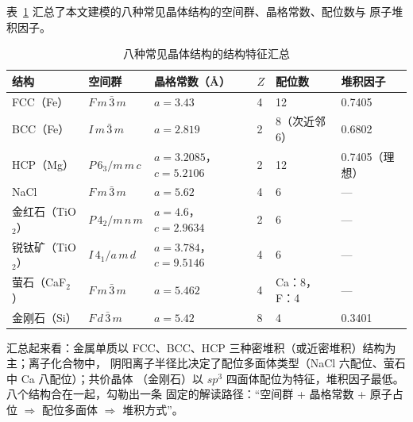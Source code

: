 表~\ref{tab:summary} 汇总了本文建模的八种常见晶体结构的空间群、晶格常数、配位数与
原子堆积因子。

\begin{table}[H]
  \centering
  \small
  \caption{八种常见晶体结构的结构特征汇总}
  \label{tab:summary}
  \begin{tabular}{@{}llllll@{}}
    \toprule
    结构 & 空间群 & 晶格常数（\AA） & $Z$ & 配位数 & 堆积因子 \\
    \midrule
    FCC（Fe） & $F\,m\,\bar3\,m$ & $a=3.43$ & 4 & 12 & 0.7405 \\
    BCC（Fe） & $I\,m\,\bar3\,m$ & $a=2.819$ & 2 & 8（次近邻 6） & 0.6802 \\
    HCP（Mg） & $P\,6_3/m\,m\,c$ & $a=3.2085$，$c=5.2106$ & 2 & 12 & 0.7405（理想） \\
    NaCl & $F\,m\,\bar3\,m$ & $a=5.62$ & 4 & 6 & — \\
    金红石（TiO$_2$） & $P\,4_2/m\,n\,m$ & $a=4.6$，$c=2.9634$ & 2 & 6 & — \\
    锐钛矿（TiO$_2$） & $I\,4_1/a\,m\,d$ & $a=3.784$，$c=9.5146$ & 4 & 6 & — \\
    萤石（CaF$_2$） & $F\,m\,\bar3\,m$ & $a=5.462$ & 4 & Ca：8，F：4 & — \\
    金刚石（Si） & $F\,d\,\bar3\,m$ & $a=5.42$ & 8 & 4 & 0.3401 \\
    \bottomrule
  \end{tabular}
\end{table}

汇总起来看：金属单质以 FCC、BCC、HCP 三种密堆积（或近密堆积）结构为主；离子化合物中，
阴阳离子半径比决定了配位多面体类型（NaCl 六配位、萤石中 Ca 八配位）；共价晶体
（金刚石）以 $sp^3$ 四面体配位为特征，堆积因子最低。八个结构合在一起，勾勒出一条
固定的解读路径：``空间群 + 晶格常数 + 原子占位 $\Rightarrow$ 配位多面体
$\Rightarrow$ 堆积方式''。
